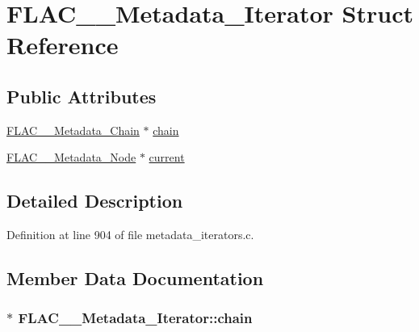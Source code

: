 \hypertarget{struct_f_l_a_c_____metadata___iterator}{}\section{F\+L\+A\+C\+\_\+\+\_\+\+Metadata\+\_\+\+Iterator Struct Reference}
\label{struct_f_l_a_c_____metadata___iterator}
\subsection*{Public Attributes}
\begin{DoxyCompactItemize}
\item 
\hyperlink{struct_f_l_a_c_____metadata___chain}{F\+L\+A\+C\+\_\+\+\_\+\+Metadata\+\_\+\+Chain} $\ast$ \hyperlink{struct_f_l_a_c_____metadata___iterator_a90cbeb7616f0b9457659bdc744bf3d28}{chain}
\item 
\hyperlink{struct_f_l_a_c_____metadata___node}{F\+L\+A\+C\+\_\+\+\_\+\+Metadata\+\_\+\+Node} $\ast$ \hyperlink{struct_f_l_a_c_____metadata___iterator_a7fee2cf1081cc26ed13f75058e91afcf}{current}
\end{DoxyCompactItemize}


\subsection{Detailed Description}


Definition at line 904 of file metadata\+\_\+iterators.\+c.



\subsection{Member Data Documentation}
\subsubsection[{\texorpdfstring{chain}{chain}}]{$\ast$ F\+L\+A\+C\+\_\+\+\_\+\+Metadata\+\_\+\+Iterator\+::chain}\hypertarget{struct_f_l_a_c_____metadata___iterator_a90cbeb7616f0b9457659bdc744bf3d28}{}\label{struct_f_l_a_c_____metadata___iterator_a90cbeb7616f0b9457659bdc744bf3d28}


